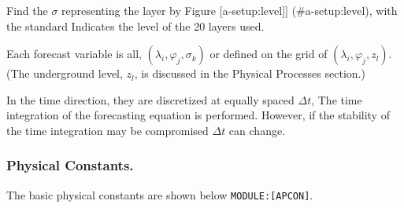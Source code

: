 Find the \(\sigma\) representing the layer by Figure
{[}a-setup:level{]}{]} (\#a-setup:level), with the standard Indicates
the level of the 20 layers used.

Each forecast variable is all, \((\lambda_i, \varphi_j, \sigma_k)\) or
defined on the grid of \((\lambda_i, \varphi_j, z_l)\). (The underground
level, \(z_l\), is discussed in the Physical Processes section.)

In the time direction, they are discretized at equally spaced
\(\Delta t\), The time integration of the forecasting equation is
performed. However, if the stability of the time integration may be
compromised \(\Delta t\) can change.

\hypertarget{physical-constants.}{%
\subsubsection{Physical Constants.}\label{physical-constants.}}

The basic physical constants are shown below
\texttt{MODULE:{[}APCON{]}}.


